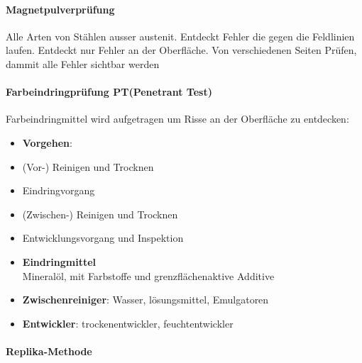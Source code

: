 \documentclass[12pt,twocolumn]{article}
\begin{document}
    \paragraph{Magnetpulverprüfung}
    Alle Arten von Stählen ausser austenit. Entdeckt Fehler die gegen die Feldlinien laufen. Entdeckt nur Fehler an der Oberfläche. Von verschiedenen Seiten Prüfen, dammit alle Fehler sichtbar werden
    \paragraph{Farbeindringprüfung PT(Penetrant Test)}
    Farbeindringmittel wird aufgetragen um Risse an der Oberfläche zu entdecken:\\
    \begin{minipage}[t]{0.70\columnwidth}
        \begin{itemize}[label={}, leftmargin=*, itemsep=0.01em]
            \item \textbf{Vorgehen}:
            \item (Vor-) Reinigen und Trocknen
            \item Eindringvorgang
            \item (Zwischen-) Reinigen und Trocknen
            \item Entwicklungsvorgang und Inspektion
        \end{itemize}
    \end{minipage}\hfill
    \begin{minipage}[t]{0.30\columnwidth}
        \begin{itemize}[label={}, leftmargin=*, itemsep=0.01em]
            \item  \textbf{Eindringmittel} \\ Mineralöl, mit Farbstoffe und
            grenzflächenaktive Additive
            
        \end{itemize}
    \end{minipage}\hfill
    \begin{itemize}[label={}, leftmargin=*, itemsep=0.01em]
        \item \textbf{Zwischenreiniger}: Wasser, lösungsmittel, Emulgatoren
        \item \textbf{Entwickler}: trockenentwickler, feuchtentwickler
    \end{itemize}
    \paragraph{Replika-Methode}
\end{document}
